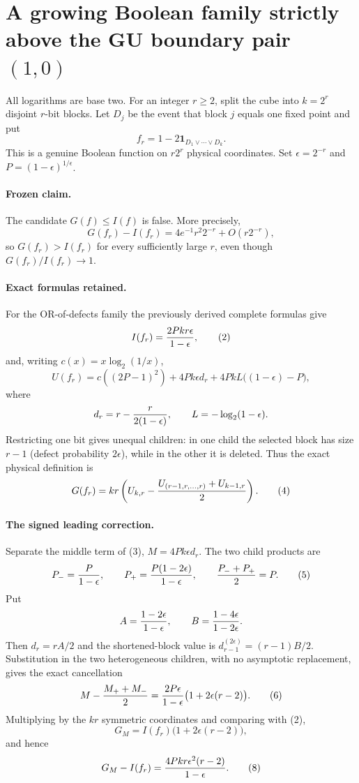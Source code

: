 \section*{A growing Boolean family strictly above the GU boundary pair $(1,0)$}

All logarithms are base two.  For an integer $r\ge2$, split the cube into
$k=2^r$ disjoint $r$-bit blocks.  Let $D_j$ be the event that block $j$
equals one fixed point and put
\[
 f_r=1-2\mathbf 1_{D_1\vee\cdots\vee D_k}.
\]
This is a genuine Boolean function on $r2^r$ physical coordinates.  Set
$\epsilon=2^{-r}$ and $P=(1-\epsilon)^{1/\epsilon}$.

\paragraph{Frozen claim.}
The candidate $G(f)\le I(f)$ is false.  More precisely,
\[
 G(f_r)-I(f_r)=4e^{-1}r^2 2^{-r}+O(r2^{-r}),             \tag{1}
\]
so $G(f_r)>I(f_r)$ for every sufficiently large $r$, even though
$G(f_r)/I(f_r)\to1$.

\paragraph{Exact formulas retained.}
For the OR-of-defects family the previously derived complete formulas give
\[
 I(f_r)={2Pkr\epsilon\over1-\epsilon},                  \tag{2}
\]
and, writing $c(x)=x\log_2(1/x)$,
\[
 U(f_r)=c((2P-1)^2)+4Pk\epsilon d_r
 +4PkL\bigl((1-\epsilon)-P\bigr),                       \tag{3}
\]
where
\[
 d_r=r-{r\over2(1-\epsilon)},\qquad
 L=-\log_2(1-\epsilon).
\]
Restricting one bit gives unequal children: in one child the selected block
has size $r-1$ (defect probability $2\epsilon$), while in the other it is
deleted.  Thus the exact physical definition is
\[
 G(f_r)=kr\left(U_{k,r}-{U_{(r-1,r,\ldots,r)}+U_{k-1,r}\over2}\right). \tag{4}
\]

\paragraph{The signed leading correction.}
Separate the middle term of (3), $M=4Pk\epsilon d_r$.  The two child
products are
\[
 P_-={P\over1-\epsilon},\qquad
 P_+={P(1-2\epsilon)\over1-\epsilon},\qquad
 {P_-+P_+\over2}=P.                                     \tag{5}
\]
Put
\[
 A={1-2\epsilon\over1-\epsilon},\qquad
 B={1-4\epsilon\over1-2\epsilon}.
\]
Then $d_r=rA/2$ and the shortened-block value is
$d_{r-1}^{(2\epsilon)}=(r-1)B/2$.  Substitution in the two heterogeneous
children, with no asymptotic replacement, gives the exact cancellation
\[
 M-{M_++M_-\over2}
 ={2P\epsilon\over1-\epsilon}\bigl(1+2\epsilon(r-2)\bigr). \tag{6}
\]
Multiplying by the $kr$ symmetric coordinates and comparing with (2),
\[
 G_M=I(f_r)\bigl(1+2\epsilon(r-2)\bigr),                \tag{7}
\]
and hence
\[
 G_M-I(f_r)={4Pkr\epsilon^2(r-2)\over1-\epsilon}.       \tag{8}
\]

